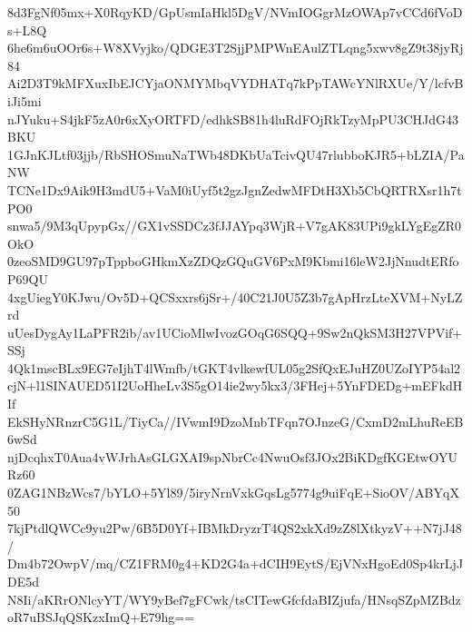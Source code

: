 8d3FgNf05mx+X0RqyKD/GpUsmIaHkl5DgV/NVmIOGgrMzOWAp7vCCd6fVoDs+L8Q
6he6m6uOOr6s+W8XVyjko/QDGE3T2SjjPMPWnEAulZTLqng5xwv8gZ9t38jyRj84
Ai2D3T9kMFXuxIbEJCYjaONMYMbqVYDHATq7kPpTAWcYNlRXUe/Y/lcfvBiJi5mi
nJYuku+S4jkF5zA0r6xXyORTFD/edhkSB81h4luRdFOjRkTzyMpPU3CHJdG43BKU
1GJnKJLtf03jjb/RbSHOSmuNaTWb48DKbUaTcivQU47rlubboKJR5+bLZIA/PaNW
TCNe1Dx9Aik9H3mdU5+VaM0iUyf5t2gzJgnZedwMFDtH3Xb5CbQRTRXsr1h7tPO0
snwa5/9M3qUpypGx//GX1vSSDCz3fJJAYpq3WjR+V7gAK83UPi9gkLYgEgZR0OkO
0zeoSMD9GU97pTppboGHkmXzZDQzGQuGV6PxM9Kbmi16leW2JjNnudtERfoP69QU
4xgUiegY0KJwu/Ov5D+QCSxxrs6jSr+/40C21J0U5Z3b7gApHrzLteXVM+NyLZrd
uUesDygAy1LaPFR2ib/av1UCioMlwIvozGOqG6SQQ+9Sw2nQkSM3H27VPVif+SSj
4Qk1mscBLx9EG7eIjhT4lWmfb/tGKT4vlkewfUL05g2SfQxEJuHZ0UZoIYP54al2
cjN+l1SINAUED51I2UoHheLv3S5gO14ie2wy5kx3/3FHej+5YnFDEDg+mEFkdHIf
EkSHyNRnzrC5G1L/TiyCa//IVwmI9DzoMnbTFqn7OJnzeG/CxmD2mLhuReEB6wSd
njDcqhxT0Aua4vWJrhAsGLGXAI9spNbrCc4NwuOsf3JOx2BiKDgfKGEtwOYURz60
0ZAG1NBzWcs7/bYLO+5Yl89/5iryNrnVxkGqsLg5774g9uiFqE+SioOV/ABYqX50
7kjPtdlQWCc9yu2Pw/6B5D0Yf+IBMkDryzrT4QS2xkXd9zZ8lXtkyzV++N7jJ48/
Dm4b72OwpV/mq/CZ1FRM0g4+KD2G4a+dCIH9EytS/EjVNxHgoEd0Sp4krLjJDE5d
N8Ii/aKRrONlcyYT/WY9yBef7gFCwk/tsCITewGfcfdaBIZjufa/HNsqSZpMZBdz
oR7uBSJqQSKzxImQ+E79hg==
